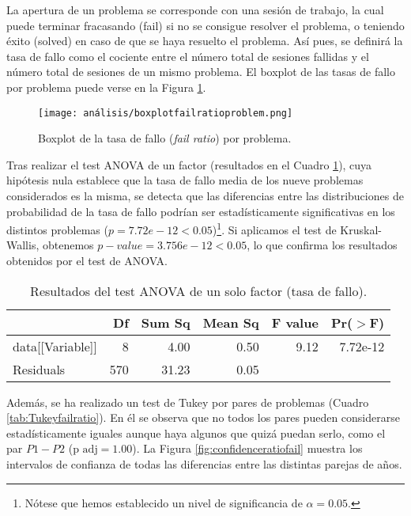 La apertura de un problema se corresponde con una sesión de trabajo, la cual puede terminar fracasando (fail) si no se consigue resolver el problema, o teniendo éxito (solved) en caso de que se haya resuelto el problema. Así pues, se definirá la tasa de fallo como el cociente entre el número total de sesiones fallidas y el número total de sesiones de un mismo problema. El boxplot de las tasas de fallo por problema puede verse en la Figura \ref{fig:boxplotfailratio}.

\begin{figure}[H]
    \centering
    \texttt{[image: análisis/boxplotfailratioproblem.png]}
    \caption{Boxplot de la tasa de fallo (\emph{fail ratio}) por problema.}
    \label{fig:boxplotfailratio}
\end{figure}

Tras realizar el test ANOVA de un factor (resultados en el Cuadro \ref{tab:ANOVAfailratio}), cuya hipótesis nula establece que la tasa de fallo media de los nueve problemas considerados es la misma, se detecta que las diferencias entre las distribuciones de probabilidad de la tasa de fallo  podrían ser estadísticamente significativas en los distintos problemas ($p = 7.72e-12 < 0.05$)\footnote{Nótese que hemos establecido un nivel de significancia de $\alpha = 0.05$.}. Si aplicamos el test de Kruskal-Wallis, obtenemos $p-value = 3.756e-12 < 0.05$, lo que confirma los resultados obtenidos por el test de ANOVA.

\begin{table}[H]
\centering
\caption{Resultados del test ANOVA de un solo factor (tasa de fallo).}
\label{tab:ANOVAfailratio}
\begin{tabular}{lrrrrr}
  \hline
 & Df & Sum Sq & Mean Sq & F value & Pr($>$F) \\ 
  \hline
data[[Variable]] & 8 & 4.00 & 0.50 & 9.12 & 7.72e-12 \\ 
  Residuals        & 570 & 31.23 & 0.05 &  &  \\ 
   \hline
\end{tabular}
\end{table}

Además, se ha realizado un test de Tukey por pares de problemas (Cuadro \ref{tab:Tukeyfailratio}). En él se observa que no todos los pares pueden considerarse estadísticamente iguales aunque haya algunos que quizá puedan serlo, como el par $P1-P2$ ($\text{p adj} = 1.00$). La Figura \ref{fig:confidenceratiofail} muestra los intervalos de confianza de todas las diferencias entre las distintas parejas de años.

